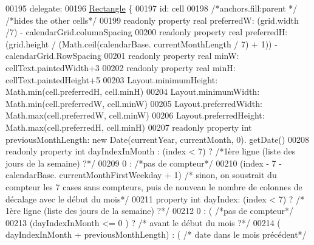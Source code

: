 \begin{DoxyCode}
{{{00195                     delegate:
00196                         \hyperlink{classRectangle}{Rectangle} \{
00197                         \textcolor{keywordtype}{id}: cell
00198                         \textcolor{comment}{/*anchors.fill:parent */} \textcolor{comment}{/*hides the other cells*/}
00199                         readonly \textcolor{keyword}{property} real preferredW: (grid.width /7) - calendarGrid.columnSpacing
00200                         readonly property real preferredH: (grid.height / (Math.ceil(calendarBase.
      currentMonthLength / 7) + 1)) - calendarGrid.RowSpacing
00201                         readonly \textcolor{keyword}{property} real minW: cellText.paintedWidth+3
00202                         readonly \textcolor{keyword}{property} real minH: cellText.paintedHeight+5
00203                         Layout.minimumHeight: Math.min(cell.preferredH, cell.minH)
00204                         Layout.minimumWidth: Math.min(cell.preferredW, cell.minW)
00205                         Layout.preferredWidth: Math.max(cell.preferredW, cell.minW)
00206                         Layout.preferredHeight: Math.max(cell.preferredH, cell.minH)
00207                         readonly \textcolor{keyword}{property} \textcolor{keywordtype}{int} previousMonthLength: \textcolor{keyword}{new} Date(currentYear, currentMonth, 0).
      getDate()
00208                         readonly \textcolor{keyword}{property} \textcolor{keywordtype}{int} dayIndexInMonth : (index < 7) ?  \textcolor{comment}{/*1ère ligne (liste des
       jours de la semaine) ?*/}
00209                                                                               0 : \textcolor{comment}{/*pas de compteur*/}
00210                                                                               (index - 7 - calendarBase.
      currentMonthFirstWeekday + 1) \textcolor{comment}{/* sinon, on soustrait du compteur les 7 cases sans compteurs, puis de nouveau le
       nombre de colonnes de décalage avec le début du mois*/}
00211                         \textcolor{keyword}{property} \textcolor{keywordtype}{int} dayIndex: (index < 7) ? \textcolor{comment}{/* 1ère ligne (liste des jours de la semaine)
       ?*/}
00212                                                              0 : ( \textcolor{comment}{/*pas de compteur*/}
00213                                                                   (dayIndexInMonth <= 0 ) ? \textcolor{comment}{/* avant le
       début du mois ?*/}
00214                                                                                             (
      dayIndexInMonth + previousMonthLength) : ( \textcolor{comment}{/* date dans le mois précédent*/}
}}}
\end{DoxyCode}
